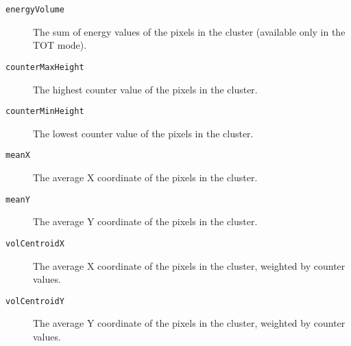 \begin{description}
	\item[\texttt{energyVolume}]	
	The sum of energy values of the pixels in the cluster (available only in the TOT mode).

	\item[\texttt{counterMaxHeight}]
	The highest counter value of the pixels in the cluster.

	\item[\texttt{counterMinHeight}]
	The lowest counter value of the pixels in the cluster.

	\item[\texttt{meanX}]
	The average X coordinate of the pixels in the cluster.

	\item[\texttt{meanY}]
	The average Y coordinate of the pixels in the cluster.

	\item[\texttt{volCentroidX}]
	The average X coordinate of the pixels in the cluster, weighted by counter values.

	\item[\texttt{volCentroidY}]
	The average Y coordinate of the pixels in the cluster, weighted by counter values.
\end{description}
